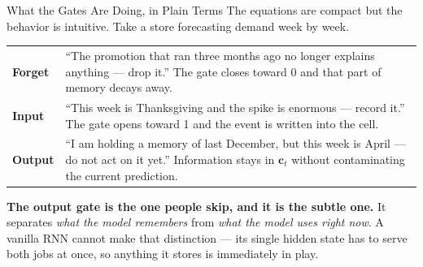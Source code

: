 \documentclass[aspectratio=169, 11pt]{beamer}
\begin{document}
\begin{frame}{What the Gates Are Doing, in Plain Terms}
  The equations are compact but the behavior is intuitive. Take a store forecasting demand week
  by week.

  \vspace{0.1cm}
  \begin{center}
    {\small
    \begin{tabular}{p{2.4cm}p{10.1cm}}
      \toprule
      \textbf{Forget} & ``The promotion that ran three months ago no longer explains anything ---
      drop it.'' The gate closes toward 0 and that part of memory decays away. \\[3pt]
      \textbf{Input} & ``This week is Thanksgiving and the spike is enormous --- record it.'' The
      gate opens toward 1 and the event is written into the cell. \\[3pt]
      \textbf{Output} & ``I am holding a memory of last December, but this week is April --- do
      not act on it yet.'' Information stays in $\mathbf{c}_t$ without contaminating the current
      prediction. \\
      \bottomrule
    \end{tabular}
    }
  \end{center}

  \vspace{0.1cm}
  \textbf{The output gate is the one people skip, and it is the subtle one.} It separates
  \emph{what the model remembers} from \emph{what the model uses right now}. A vanilla RNN cannot
  make that distinction --- its single hidden state has to serve both jobs at once, so anything
  it stores is immediately in play.
\end{frame}
\end{document}
